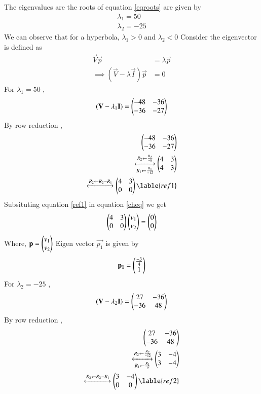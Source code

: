 \documentclass[journal,12pt,twocolumn]{IEEEtran}
\begin{document}
The eigenvalues are the roots of equation \ref{eqroots} are given by 
\begin{align}
    \lambda_1=50\label{eqeig1}\\
    \lambda_2=-25\label{eqeig2}
\end{align}
We can observe that for a hyperbola, $\lambda_1>0$ and  $\lambda_2<0$
Consider the eigenvector  is defined as 
\begin{align}
    \vec{V}\vec{p}&=\lambda\vec{p}\\
    \implies (\vec{V}-\lambda\vec{I})\vec{p}&=0\label{cheq}
\end{align}
For $\lambda_1=50$ ,
\begin{align}
    (\mathbf{V}-\lambda_1\mathbf{I})=\begin{pmatrix}-48&-36\\-36&-27\end{pmatrix}
\end{align}
By row reduction , 
\begin{align}
    \myvec{-48&-36\\-36&-27}\\
    \xleftrightarrow[R_1\leftarrow\frac{R_1}{-12}]
    {R_2\leftarrow\frac{R_2}{-9}}
    \myvec{4&3\\4&3}\label{eqs1}\\
    \xleftrightarrow[]{R_2\leftarrow R_2-R_1}
    \myvec{4&3\\0&0}\lable{ref1}
\end{align}
Subsituting equation \eqref{ref1} in equation \eqref{cheq} we get
\begin{align}
        \begin{pmatrix}4&3\\0&0\end{pmatrix}\begin{pmatrix}v_1\\v_2\end{pmatrix}=\begin{pmatrix}0\\0\end{pmatrix}\label{eig1}
\end{align}
Where, $\mathbf{p}=\begin{pmatrix}v_1\\v_2\end{pmatrix}$
Eigen vector $\vec{p_1}$ is given by
\begin{align}
    \mathbf{p_1}=\begin{pmatrix}\frac{-3}{4}\\1\end{pmatrix}\label{ev1}
\end{align}
For $\lambda_2=-25$ ,
\begin{align}
    (\mathbf{V}-\lambda_2\mathbf{I})=\begin{pmatrix}27&-36\\-36&48\end{pmatrix}
\end{align}
By row reduction , 
\begin{align}
    \myvec{27&-36\\-36&48}\\
    \xleftrightarrow[R_1\leftarrow\frac{R_1}{9}]
    {R_2\leftarrow\frac{R_2}{-12}}
    \myvec{3&-4\\3&-4}\label{eqs1}\\
    \xleftrightarrow[]{R_2\leftarrow R_2-R_1}
    \myvec{3&-4\\0&0}\lable{ref2}
\end{align} 
\end{document}

